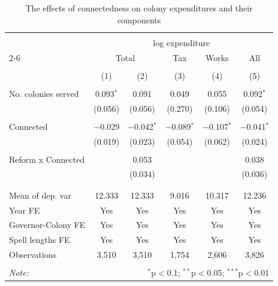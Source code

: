 \documentclass[a4paper]{article}\usepackage[]{graphicx}\usepackage[]{xcolor}
\begin{document}
\begin{table}[!htbp] \centering 
  \caption{The effects of connectedness on colony expenditures and their components} 
  \label{tab:exp} 
\scriptsize 
\begin{tabular}{@{\extracolsep{5pt}}lccccc} 
\\[-1.8ex]\hline 
\hline \\[-1.8ex] 
 & \multicolumn{5}{c}{log expenditure} \\ 
\cline{2-6} 
 & \multicolumn{2}{c}{Total} & Tax & Works & All \\ 
\\[-1.8ex] & (1) & (2) & (3) & (4) & (5)\\ 
\hline \\[-1.8ex] 
 No. colonies served & 0.093$^{*}$ & 0.091 & 0.049 & 0.055 & 0.092$^{*}$ \\ 
  & (0.056) & (0.056) & (0.270) & (0.106) & (0.054) \\ 
  & & & & & \\ 
 Connected & $-$0.029 & $-$0.042$^{*}$ & $-$0.089$^{*}$ & $-$0.107$^{*}$ & $-$0.041$^{*}$ \\ 
  & (0.019) & (0.023) & (0.054) & (0.062) & (0.024) \\ 
  & & & & & \\ 
 Reform x Connected &  & 0.053 &  &  & 0.038 \\ 
  &  & (0.034) &  &  & (0.036) \\ 
  & & & & & \\ 
\hline \\[-1.8ex] 
Mean of dep. var & 12.333 & 12.333 & 9.016 & 10.317 & 12.236 \\ 
Year FE & Yes & Yes & Yes & Yes & Yes \\ 
Governor-Colony FE & Yes & Yes & Yes & Yes & Yes \\ 
Spell lengths FE & Yes & Yes & Yes & Yes & Yes \\ 
Observations & 3,510 & 3,510 & 1,754 & 2,606 & 3,826 \\ 
\hline 
\hline \\[-1.8ex] 
\textit{Note:}  & \multicolumn{5}{r}{$^{*}$p$<$0.1; $^{**}$p$<$0.05; $^{***}$p$<$0.01} \\ 
\end{tabular} 
\end{table} 
\end{document}
